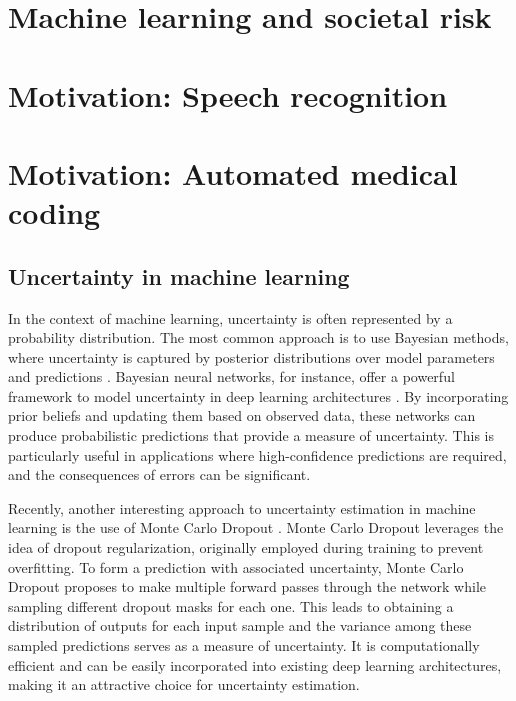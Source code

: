 \section{Machine learning and societal risk}
\cite{europeancommission_briefing_2021}


\section{Motivation: Speech recognition}


\section{Motivation: Automated medical coding}


\subsection{Uncertainty in machine learning}


In the context of machine learning, uncertainty is often represented by a probability distribution. The most common approach is to use Bayesian methods, where uncertainty is captured by posterior distributions over model parameters and predictions \cite{gelman_bayesian_2013}. Bayesian neural networks, for instance, offer a powerful framework to model uncertainty in deep learning architectures \cite{neal_bayesian_1995}. By incorporating prior beliefs and updating them based on observed data, these networks can produce probabilistic predictions that provide a measure of uncertainty. This is particularly useful in applications where high-confidence predictions are required, and the consequences of errors can be significant.

Recently, another interesting approach to uncertainty estimation in machine learning is the use of Monte Carlo Dropout \cite{gal_dropout_2016}. Monte Carlo Dropout leverages the idea of dropout regularization, originally employed during training to prevent overfitting. To form a prediction with associated uncertainty, Monte Carlo Dropout proposes to make multiple forward passes through the network while sampling different dropout masks for each one. This leads to obtaining a distribution of outputs for each input sample and the variance among these sampled predictions serves as a measure of uncertainty. It is computationally efficient and can be easily incorporated into existing deep learning architectures, making it an attractive choice for uncertainty estimation.

